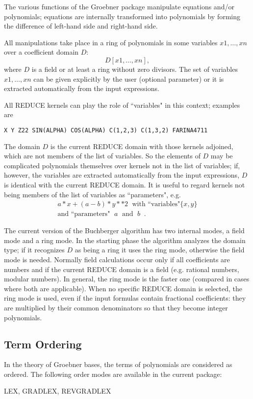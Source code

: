 The various functions of the Groebner package manipulate
equations and/or polynomials; equations are internally
transformed into  polynomials by forming the difference of
left-hand side and right-hand side.

All manipulations take place in a ring of polynomials in some
variables $x1, \ldots , xn$ over a coefficient domain $D$:
\[
D [x1,\ldots , xn],
\]
where $D$ is a field or at least a ring without zero divisors.
The set of variables $x1,\ldots ,xn$ can be given explicitly by the
user (optional parameter) or it is extracted automatically from the
input expressions.

All REDUCE kernels can play the role of ``variables" in this context;
examples are

\begin{verbatim}
X Y Z22 SIN(ALPHA) COS(ALPHA) C(1,2,3) C(1,3,2) FARINA4711
\end{verbatim}

The domain $D$ is the current REDUCE domain with those kernels
adjoined, which are not members of the list of variables. So the
elements of $D$ may be complicated polynomials themselves over
kernels not in the list of variables; if, however, the variables are
extracted automatically from the input expressions, $D$ is identical
with the current REDUCE domain. It is useful to regard kernels not
being members of the list of variables as ``parameters", e.g.  
\[
\begin{array}{c}
 a * x + (a - b) * y**2 \;\mbox{ with ``variables"}\{x,y\} \\
\mbox{and ``parameters"  $\;a\;$ and $\;b\;$}\;.
\end{array}
\]

The current version of the Buchberger algorithm has two internal
modes, a field mode and a ring mode. In the starting phase the
algorithm analyzes the domain type; if it recognizes $D$ as being a
ring it uses the ring mode, otherwise the field mode is needed.
Normally field calculations occur only if all coefficients are numbers
and if the current REDUCE domain is a field (e.g. rational numbers,
modular numbers). In general, the ring mode is the faster one
(compared in cases where both are applicable). When no specific
REDUCE domain is selected, the ring mode is used, even if the input
formulas contain fractional coefficients: they are multiplied by their
common denominators so that they become integer polynomials.

\subsection{Term Ordering} \par
In the theory of Groebner bases, the terms of polynomials are
considered as ordered. The following order modes are available in
the current package: 
\begin{center}
LEX, GRADLEX, REVGRADLEX
\end{center}

